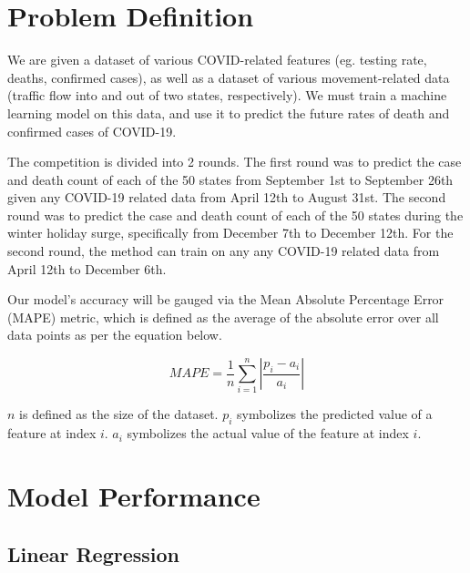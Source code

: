 \documentclass[sigconf,nonacm]{acmart}
\begin{document}
\section{Problem Definition}

We are given a dataset of various COVID-related features (eg. testing rate,
deaths, confirmed cases), as well as a dataset of various movement-related data
(traffic flow into and out of two states, respectively). 
We must train a machine learning model on this data, and use it to predict the
future rates of death and confirmed cases of COVID-19. 

The competition is divided into 2 rounds. The first round was to predict the
case and death count of each of the 50 states from September 1st to September
26th given any COVID-19 related data from April 12th to August 31st. The second
round was to predict the case and death count of each of the 50 states during
the winter holiday surge, specifically from December 7th to December 12th. 
For
the second round, the method can train on any any COVID-19 related data from
April 12th to December 6th. 

Our model's accuracy will be gauged via the Mean Absolute Percentage Error
(MAPE) metric, which is defined as the average of the absolute error over all
data points as per the equation below. 

$$MAPE = \frac{1}{n} \sum_{i = 1}^{n} |\frac{p_i - a_i}{a_i} |$$

$n$ is defined as the size of the dataset. $p_i$ symbolizes the predicted value
of a feature at index $i$. $a_i$ symbolizes the actual value of the feature at
index $i$.


\section{Model Performance}

\subsection{Linear Regression}
\end{document}
